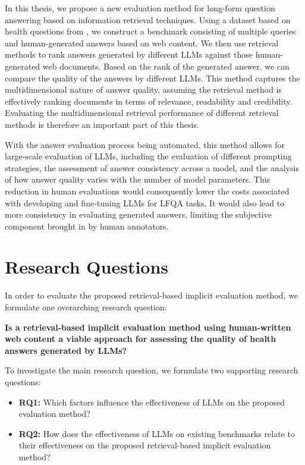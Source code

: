 In this thesis, we propose a new evaluation method for long-form question answering based on information retrieval techniques.
Using a dataset based on health questions from \cite{goeuriot:2021:Consumer}, we construct a benchmark consisting of multiple queries and human-generated answers based on web content.
We then use retrieval methods to rank answers generated by different LLMs against those human-generated web documents.
Based on the rank of the generated answer, we can compare the quality of the answers by different LLMs.
This method captures the multidimensional nature of answer quality, assuming the retrieval method is effectively ranking documents in terms of relevance, readability and credibility.
Evaluating the multidimensional retrieval performance of different retrieval methods is therefore an important part of this thesis.

With the answer evaluation process being automated, this method allows for large-scale evaluation of LLMs, including the evaluation of different prompting strategies, the assessment of answer consistency across a model, and the analysis of how answer quality varies with the number of model parameters.
This reduction in human evaluations would consequently lower the costs associated with developing and fine-tuning LLMs for LFQA tasks.
It would also lead to more consistency in evaluating generated answers, limiting the subjective component brought in by human annotators.

\section{Research Questions}\label{sec:research-question}
In order to evaluate the proposed retrieval-based implicit evaluation method, we formulate one overarching research question:

\begin{center}
\textbf{Is a retrieval-based implicit evaluation method using human-written web content a viable approach for assessing the quality of health answers generated by LLMs?}
\end{center}

To investigate the main research question, we formulate two supporting research questions:

\begin{itemize}
    \item \textbf{RQ1:} Which factors influence the effectiveness of LLMs on the proposed evaluation method?
    \item \textbf{RQ2:} How does the effectiveness of LLMs on existing benchmarks relate to their effectiveness on the proposed retrieval-based implicit evaluation method?
\end{itemize}



